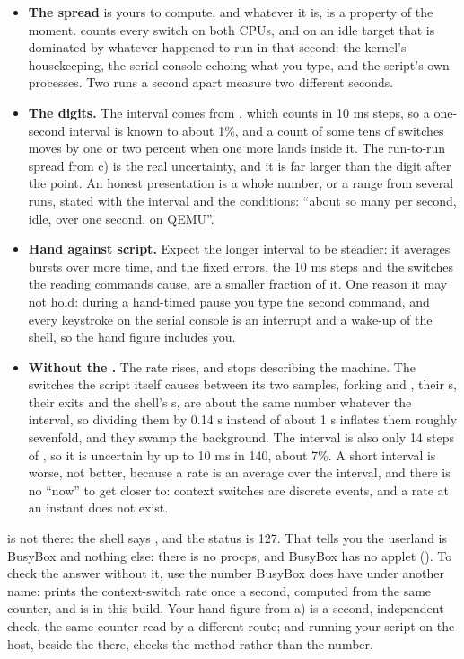 \begin{itemize}
  \item \textbf{The spread} is yours to compute, and whatever it is,  is a
    property of the moment.  counts every switch on both CPUs, and on an idle target that
    is dominated by whatever happened to run in that second: the kernel's housekeeping, the serial
    console echoing what you type, and the script's own processes. Two runs a second apart measure
    two different seconds.
  \item \textbf{The digits.} The interval comes from , which counts in 10 ms
    steps, so a one-second interval is known to about 1\%, and a count of some tens of switches
    moves by one or two percent when one more lands inside it. The run-to-run spread from c) is the real
    uncertainty, and it is far larger than the digit after the point. An honest presentation is a
    whole number, or a range from several runs, stated with the interval and the conditions:
    ``about so many per second, idle, over one second, on QEMU''.
  \item \textbf{Hand against script.} Expect the longer interval to be steadier: it averages bursts
    over more time, and the fixed errors, the 10 ms steps and the switches the reading commands
    cause, are a smaller fraction of it. One reason it may not hold: during a hand-timed pause you
    type the second command, and every keystroke on the serial console is an interrupt and a
    wake-up of the shell, so the hand figure includes you.
  \item \textbf{Without the .} The rate rises, and stops describing the machine. The
    switches the script itself causes between its two samples, forking  and ,
    their s, their exits and the shell's s, are about the same number
    whatever the interval, so dividing them by 0.14 s instead of about 1 s inflates them roughly
    sevenfold, and they swamp the background. The interval is also only 14 steps of
    , so it is uncertain by up to 10 ms in 140, about 7\%. A short interval is
    worse, not better, because a rate is an average over the interval, and there is no ``now'' to
    get closer to: context switches are discrete events, and a rate at an instant does not exist.
\end{itemize}

  is not there: the shell says , and the status
is 127. That tells you the userland is BusyBox and nothing else: there is no procps, and BusyBox has
no  applet (). To check the answer without it, use the number
BusyBox does have under another name:  prints the context-switch rate once a
second, computed from the same  counter, and  is in this build. Your hand
figure from a) is a second, independent check, the same counter read by a different route; and
running your script on the host, beside the  there, checks the method rather than the
number.

